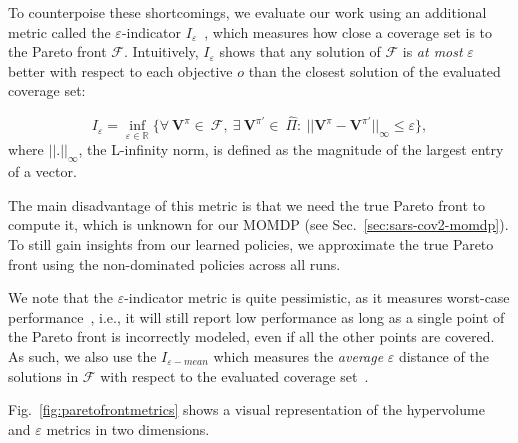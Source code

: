 \documentclass{article}
\renewcommand{\cite}[1]{\citep{#1}}
\newcommand{\momdpvaluefunction}{\mathbf{V}}
\begin{document}
To counterpoise these shortcomings, we evaluate our work using an additional metric called the $\varepsilon$-indicator $I_\varepsilon$~\cite{zitzler2003}, which measures how close a coverage set is to the Pareto front $\mathcal{F}$. Intuitively, $I_\varepsilon$ shows that any solution of $\mathcal{F}$ is \emph{at most} $\varepsilon$ better with respect to each objective $o$ than the closest solution of the evaluated coverage set:

\begin{equation}
\label{eq:epsilon-metric}
    I_{\varepsilon} = 
    \inf_{\varepsilon\in\mathbb{R}} 
    \{ 
    \forall\ \momdpvaluefunction^\pi\!{\in}\ \mathcal{F}, ~
    \exists\ \momdpvaluefunction^{\pi'}\!{\in}\ \hat{\Pi} :\ 
    || \momdpvaluefunction^\pi - \momdpvaluefunction^{\pi'} ||_{\infty} \le \varepsilon
    \},
\end{equation}
%
where $||.||_{\infty}$, the L-infinity norm, is defined as the magnitude of the largest entry of a vector.

The main disadvantage of this metric is that we need the true Pareto front to compute it, which is unknown for our MOMDP (see Sec.~\ref{sec:sars-cov2-momdp}). To still gain insights from our learned policies, we approximate the true Pareto front using the non-dominated policies across all runs.

We note that the $\varepsilon$-indicator metric is quite pessimistic, as it measures worst-case performance~\cite{zintgraf2015}, i.e., it will still report low performance as long as a single point of the Pareto front is incorrectly modeled, even if all the other points are covered. As such, we also use the $I_{\varepsilon-mean}$ which measures the \emph{average} $\varepsilon$ distance of the solutions in $\mathcal{F}$ with respect to the evaluated coverage set~\cite{reymond2022pcn}.

Fig.~\ref{fig:paretofrontmetrics} shows a visual representation of the hypervolume and $\varepsilon$ metrics in two dimensions.
\end{document}
